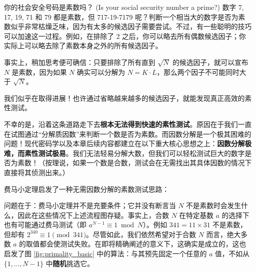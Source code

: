 \begin{sidebarbox}{你的社会安全号码是素数吗？ (Is your social security number a prime?)}
数字 7, 17, 19, 71 和 79 都是素数，但 717-19-7179 呢？判断一个相当大的数字是否为素数似乎非常枯燥乏味，因为有太多的候选因子需要尝试。不过，有一些聪明的技巧可以加速这一过程。例如，在排除了 2 之后，你可以略去所有偶数候选因子；你实际上可以略去除了素数本身之外的所有候选因子。

事实上，稍加思考便可确信：只要排除了所有直到 $\sqrt{N}$ 的候选因子，就可以宣布 $N$ 是素数，因为如果 $N$ 确实可以分解为 $N = K \cdot L$，那么两个因子不可能同时大于 $\sqrt{N}$。

我们似乎在取得进展！也许通过省略越来越多的候选因子，就能发现真正高效的素性测试。

不幸的是，沿着这条道路走下去\textbf{根本无法得到快速的素性测试}。原因在于我们一直在试图通过“分解质因数”来判断一个数是否为素数。而因数分解是一个极其困难的问题！现代密码学以及本章后续内容都建立在以下重大核心思想之上：\textbf{因数分解极难，而素性测试极易}。我们无法轻易分解大数，但我们可以轻松测试巨大的数字是否为素数！（按理说，如果一个数是合数，测试会在无需找出其具体因数的情况下直接将其侦测出来。）
\end{sidebarbox}

费马小定理启发了一种无需因数分解的素数测试思路：
\begin{center}
\end{center}

问题在于：费马小定理并不是充要条件；它并没有断言当 $N$ 不是素数时会发生什么，因此在这些情况下上述流程图存疑。事实上，合数 $N$ 在特定基数 $a$ 的选择下也有可能通过费马测试（即 $a^{N-1} \equiv 1 \bmod N$）。例如 $341 = 11 \times 31$ 不是素数，但却有 $2^{340} \equiv 1 \pmod{341}$。尽管如此，我们依然希望对于合数 $N$ 而言，绝大多数 $a$ 的取值都会使测试失败。在即将精确阐述的意义下，这确实是成立的，这也启发了图 \ref{fig:primality_basic} 中的算法：与其预先固定一个任意的 $a$ 值，不如从 $\{1, \dots, N-1\}$ 中\textbf{随机}挑选它。

